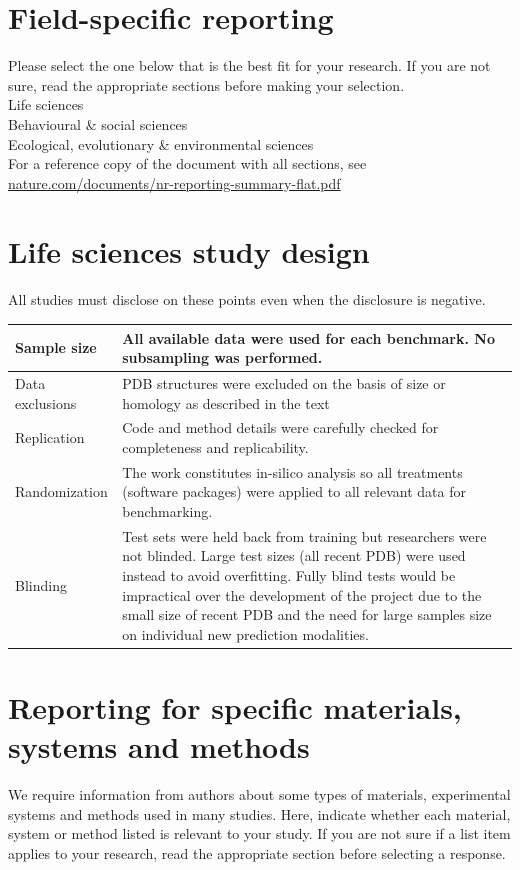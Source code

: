\documentclass[10pt]{article}
\begin{document}
\section*{Field-specific reporting}
Please select the one below that is the best fit for your research. If you are not sure, read the appropriate sections before making your selection.\\
Life sciences\\
Behavioural \& social sciences\\
Ecological, evolutionary \& environmental sciences\\
For a reference copy of the document with all sections, see \href{http://nature.com/documents/nr-reporting-summary-flat.pdf}{nature.com/documents/nr-reporting-summary-flat.pdf}

\section*{Life sciences study design}
All studies must disclose on these points even when the disclosure is negative.

\begin{center}
\begin{tabular}{|l|l|}
\hline
Sample size & All available data were used for each benchmark. No subsampling was performed. \\
\hline
Data exclusions & PDB structures were excluded on the basis of size or homology as described in the text \\
\hline
Replication & Code and method details were carefully checked for completeness and replicability. \\
\hline
Randomization & The work constitutes in-silico analysis so all treatments (software packages) were applied to all relevant data for benchmarking. \\
\hline
Blinding & Test sets were held back from training but researchers were not blinded. Large test sizes (all recent PDB) were used instead to avoid overfitting. Fully blind tests would be impractical over the development of the project due to the small size of recent PDB and the need for large samples size on individual new prediction modalities. \\
\hline
\end{tabular}
\end{center}

\section*{Reporting for specific materials, systems and methods}
We require information from authors about some types of materials, experimental systems and methods used in many studies. Here, indicate whether each material, system or method listed is relevant to your study. If you are not sure if a list item applies to your research, read the appropriate section before selecting a response.
\end{document}
